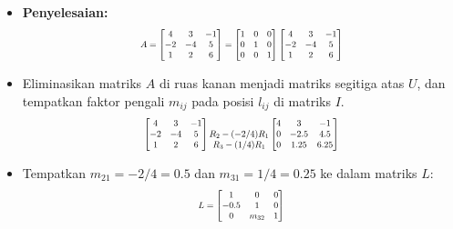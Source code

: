 \documentclass[pdflatex,compress,mathserif]{beamer}
\newcommand*{\Scale}[2][4]{\scalebox{#1}{$#2$}}%
\begin{document}
\begin{frame}
	\begin{itemize}
		\item \textbf{Penyelesaian:}
		\[\Scale[0.7]{ A = 
		\begin{bmatrix}
			4 & 3 & -1\\
			-2 & -4 & 5\\
			1 & 2 & 6\\
		\end{bmatrix}
		=
		\begin{bmatrix}
			1 & 0 & 0\\
			0 & 1 & 0\\
			0 & 0 & 1\\
		\end{bmatrix}
		\begin{bmatrix}
			4 & 3 & -1\\
			-2 & -4 & 5\\
			1 & 2 & 6\\
		\end{bmatrix}
		}\]
		\item Eliminasikan matriks $ A $ di ruas kanan menjadi matriks segitiga atas $ U $, dan tempatkan faktor pengali $ m_{ij} $ pada posisi $ l_{ij} $ di matriks $ I $.
		\[\Scale[0.7]{
		\begin{bmatrix}
			4 & 3 & -1\\
			-2 & -4 & 5\\
			1 & 2 & 6\\
		\end{bmatrix}
		\begin{matrix}
			\\
			R_2 - (-2/4)R_1\\
			R_3 - (1/4)R_1
		\end{matrix}
		\begin{bmatrix}
			4 & 3 & -1\\
			0 & -2.5 & 4.5\\
			0 & 1.25 & 6.25\\
		\end{bmatrix}
		}\]
		\item Tempatkan $ m_{21} = -2/4 = 0.5 $ dan $ m_{31} = 1/4 = 0.25 $ ke dalam matriks $ L $:
		\[\Scale[0.7]{ L = 
		\begin{bmatrix}
			1 & 0 & 0\\
			-0.5 & 1 & 0\\
			0 & m_{32} & 1\\
		\end{bmatrix}
		}\]
	\end{itemize}
\end{frame}
\end{document}
